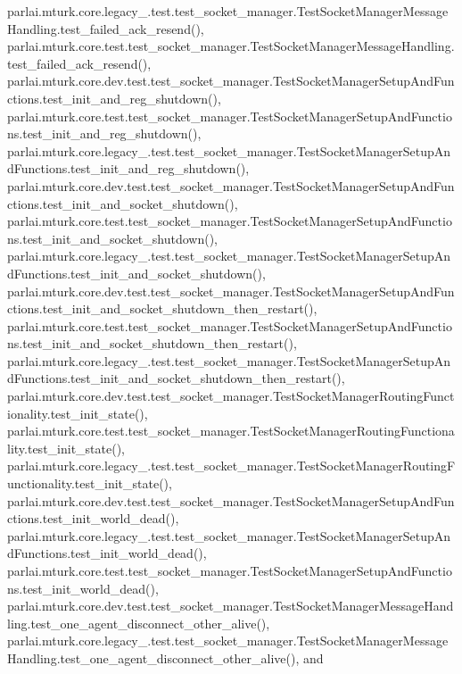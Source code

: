 parlai.\+mturk.\+core.\+legacy\+\_.\+test.\+test\+\_\+socket\+\_\+manager.\+Test\+Socket\+Manager\+Message\+Handling.\+test\+\_\+failed\+\_\+ack\+\_\+resend(), parlai.\+mturk.\+core.\+test.\+test\+\_\+socket\+\_\+manager.\+Test\+Socket\+Manager\+Message\+Handling.\+test\+\_\+failed\+\_\+ack\+\_\+resend(), parlai.\+mturk.\+core.\+dev.\+test.\+test\+\_\+socket\+\_\+manager.\+Test\+Socket\+Manager\+Setup\+And\+Functions.\+test\+\_\+init\+\_\+and\+\_\+reg\+\_\+shutdown(), parlai.\+mturk.\+core.\+test.\+test\+\_\+socket\+\_\+manager.\+Test\+Socket\+Manager\+Setup\+And\+Functions.\+test\+\_\+init\+\_\+and\+\_\+reg\+\_\+shutdown(), parlai.\+mturk.\+core.\+legacy\+\_.\+test.\+test\+\_\+socket\+\_\+manager.\+Test\+Socket\+Manager\+Setup\+And\+Functions.\+test\+\_\+init\+\_\+and\+\_\+reg\+\_\+shutdown(), parlai.\+mturk.\+core.\+dev.\+test.\+test\+\_\+socket\+\_\+manager.\+Test\+Socket\+Manager\+Setup\+And\+Functions.\+test\+\_\+init\+\_\+and\+\_\+socket\+\_\+shutdown(), parlai.\+mturk.\+core.\+test.\+test\+\_\+socket\+\_\+manager.\+Test\+Socket\+Manager\+Setup\+And\+Functions.\+test\+\_\+init\+\_\+and\+\_\+socket\+\_\+shutdown(), parlai.\+mturk.\+core.\+legacy\+\_.\+test.\+test\+\_\+socket\+\_\+manager.\+Test\+Socket\+Manager\+Setup\+And\+Functions.\+test\+\_\+init\+\_\+and\+\_\+socket\+\_\+shutdown(), parlai.\+mturk.\+core.\+dev.\+test.\+test\+\_\+socket\+\_\+manager.\+Test\+Socket\+Manager\+Setup\+And\+Functions.\+test\+\_\+init\+\_\+and\+\_\+socket\+\_\+shutdown\+\_\+then\+\_\+restart(), parlai.\+mturk.\+core.\+test.\+test\+\_\+socket\+\_\+manager.\+Test\+Socket\+Manager\+Setup\+And\+Functions.\+test\+\_\+init\+\_\+and\+\_\+socket\+\_\+shutdown\+\_\+then\+\_\+restart(), parlai.\+mturk.\+core.\+legacy\+\_.\+test.\+test\+\_\+socket\+\_\+manager.\+Test\+Socket\+Manager\+Setup\+And\+Functions.\+test\+\_\+init\+\_\+and\+\_\+socket\+\_\+shutdown\+\_\+then\+\_\+restart(), parlai.\+mturk.\+core.\+dev.\+test.\+test\+\_\+socket\+\_\+manager.\+Test\+Socket\+Manager\+Routing\+Functionality.\+test\+\_\+init\+\_\+state(), parlai.\+mturk.\+core.\+test.\+test\+\_\+socket\+\_\+manager.\+Test\+Socket\+Manager\+Routing\+Functionality.\+test\+\_\+init\+\_\+state(), parlai.\+mturk.\+core.\+legacy\+\_.\+test.\+test\+\_\+socket\+\_\+manager.\+Test\+Socket\+Manager\+Routing\+Functionality.\+test\+\_\+init\+\_\+state(), parlai.\+mturk.\+core.\+dev.\+test.\+test\+\_\+socket\+\_\+manager.\+Test\+Socket\+Manager\+Setup\+And\+Functions.\+test\+\_\+init\+\_\+world\+\_\+dead(), parlai.\+mturk.\+core.\+legacy\+\_.\+test.\+test\+\_\+socket\+\_\+manager.\+Test\+Socket\+Manager\+Setup\+And\+Functions.\+test\+\_\+init\+\_\+world\+\_\+dead(), parlai.\+mturk.\+core.\+test.\+test\+\_\+socket\+\_\+manager.\+Test\+Socket\+Manager\+Setup\+And\+Functions.\+test\+\_\+init\+\_\+world\+\_\+dead(), parlai.\+mturk.\+core.\+dev.\+test.\+test\+\_\+socket\+\_\+manager.\+Test\+Socket\+Manager\+Message\+Handling.\+test\+\_\+one\+\_\+agent\+\_\+disconnect\+\_\+other\+\_\+alive(), parlai.\+mturk.\+core.\+legacy\+\_.\+test.\+test\+\_\+socket\+\_\+manager.\+Test\+Socket\+Manager\+Message\+Handling.\+test\+\_\+one\+\_\+agent\+\_\+disconnect\+\_\+other\+\_\+alive(), and 